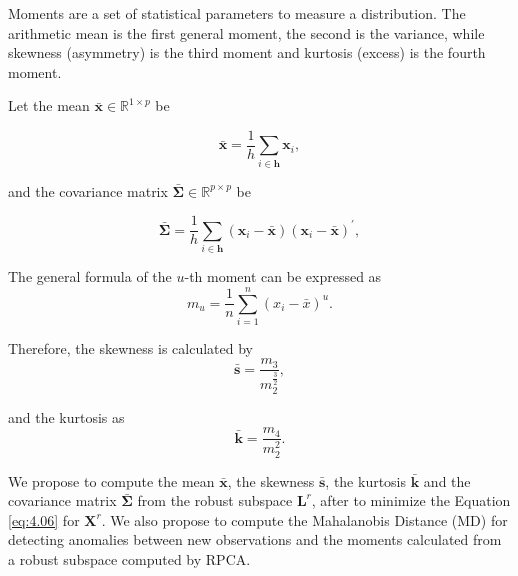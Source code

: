 Moments are a set of statistical parameters to measure a distribution. The arithmetic mean is the first general moment, the second is the variance, while skewness (asymmetry) is the third moment and kurtosis (excess) is the fourth moment.

Let the mean $\bar{\boldsymbol{x}} \in \mathbb{R}^{1 \times p}$ be

\begin{equation}\label{eq:4.07}
	\bar{\boldsymbol{x}} = \displaystyle\frac{1}{h}\displaystyle\sum_{i\in \boldsymbol{h}} \boldsymbol{x}_i, 
\end{equation}

and the covariance matrix $\boldsymbol{\bar{\Sigma}} \in \mathbb{R}^{p \times p}$ be

\begin{equation}\label{eq:4.08}
	\boldsymbol{\bar{\Sigma}} = \displaystyle\frac{1}{h}\displaystyle\sum_{i\in \boldsymbol{h}} (\boldsymbol{x}_i - \bar{\boldsymbol{x}})(\boldsymbol{x}_i - \bar{\boldsymbol{x}})^\prime,
\end{equation}

The general formula of the $u$-th moment can be expressed as
\begin{equation}\label{eq:4.09}
	m_u = \displaystyle\frac{1}{n}\displaystyle\sum_{i = 1}^{n}( x_i - \bar{x})^u.
\end{equation}

Therefore, the skewness is calculated by
\begin{equation}\label{eq:4.10}
	\boldsymbol{\bar{s}} = \frac{m_3}{m_2^{\frac{3}{2}}},
\end{equation}

and the kurtosis as
\begin{equation}\label{eq:4.11}
	\boldsymbol{\bar{k}} = \frac{m_4}{m_2^2}.
\end{equation}

We propose to compute the mean $\boldsymbol{\bar{x}}$, the skewness $\boldsymbol{\bar{s}}$, the kurtosis $\boldsymbol{\bar{k}}$ and the covariance matrix $\boldsymbol{\bar{\Sigma}}$ from the robust subspace $\boldsymbol{L}^r$, after to minimize the Equation \ref{eq:4.06} for $\textbf{X}^r$. We also propose to compute the Mahalanobis Distance (MD) for detecting anomalies between new observations and the moments calculated from a robust subspace computed by RPCA. 

